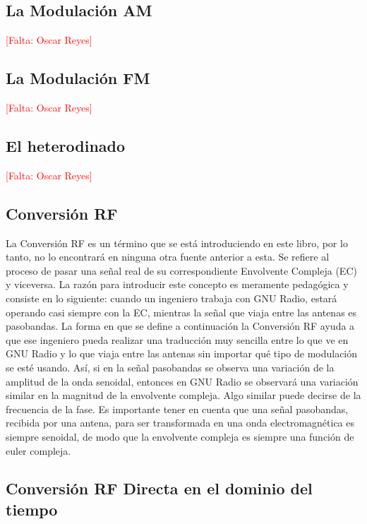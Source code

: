 \subsection{La Modulación AM}

\textcolor{red}{[Falta: Oscar Reyes]} %

\subsection{La Modulación FM}

\textcolor{red}{[Falta: Oscar Reyes]}


\subsection{El heterodinado}
\textcolor{red}{[Falta: Oscar Reyes]}

\subsection{Conversión RF}

La Conversión RF es un término que se está introduciendo en este libro, por lo tanto, no lo encontrará en ninguna otra fuente anterior a esta. Se refiere al proceso de pasar una señal real de su correspondiente Envolvente Compleja (EC) y viceversa. La razón para introducir este concepto es meramente pedagógica y consiste en lo siguiente: cuando un ingeniero trabaja con GNU Radio, estará operando casi siempre con la EC, mientras la señal que viaja entre las antenas es pasobandas. La forma en que se define a continuación la Conversión RF ayuda a que ese ingeniero pueda realizar una traducción muy sencilla entre lo que ve en GNU Radio y lo que viaja entre las antenas sin importar qué tipo de modulación se esté usando. Así, si en la señal pasobandas se observa una variación de la amplitud de la onda senoidal, entonces en GNU Radio se observará una variación similar en la magnitud de la envolvente compleja. Algo similar puede decirse de la frecuencia de la fase. Es importante tener en cuenta que una señal pasobandas, recibida por una antena, para ser transformada en una onda electromagnética es siempre senoidal, de modo que la envolvente compleja es siempre una función de euler compleja.\\

\subsection{Conversión RF Directa en el dominio del tiempo}

